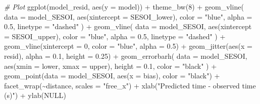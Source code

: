 \documentclass[fleqn,10pt,lineno]{wlpeerj} %
\newenvironment{Shaded}{\begin{snugshade}}{\end{snugshade}}
\newcommand{\AttributeTok}[1]{\textcolor[rgb]{0.77,0.63,0.00}{#1}}
\newcommand{\CommentTok}[1]{\textcolor[rgb]{0.56,0.35,0.01}{\textit{#1}}}
\newcommand{\ConstantTok}[1]{\textcolor[rgb]{0.00,0.00,0.00}{#1}}
\newcommand{\DecValTok}[1]{\textcolor[rgb]{0.00,0.00,0.81}{#1}}
\newcommand{\FloatTok}[1]{\textcolor[rgb]{0.00,0.00,0.81}{#1}}
\newcommand{\FunctionTok}[1]{\textcolor[rgb]{0.00,0.00,0.00}{#1}}
\newcommand{\NormalTok}[1]{#1}
\newcommand{\SpecialCharTok}[1]{\textcolor[rgb]{0.00,0.00,0.00}{#1}}
\newcommand{\StringTok}[1]{\textcolor[rgb]{0.31,0.60,0.02}{#1}}
\begin{document}
\begin{Shaded}
\begin{Highlighting}[]
\CommentTok{\# Plot}
\FunctionTok{ggplot}\NormalTok{(model\_resid, }\FunctionTok{aes}\NormalTok{(}\AttributeTok{y =}\NormalTok{ model)) }\SpecialCharTok{+}
  \FunctionTok{theme\_bw}\NormalTok{(}\DecValTok{8}\NormalTok{) }\SpecialCharTok{+}
  \FunctionTok{geom\_vline}\NormalTok{(}
    \AttributeTok{data =}\NormalTok{ model\_SESOI,}
    \FunctionTok{aes}\NormalTok{(}\AttributeTok{xintercept =}\NormalTok{ SESOI\_lower),}
    \AttributeTok{color =} \StringTok{"blue"}\NormalTok{, }\AttributeTok{alpha =} \FloatTok{0.5}\NormalTok{, }\AttributeTok{linetype =} \StringTok{"dashed"}
\NormalTok{  ) }\SpecialCharTok{+}
  \FunctionTok{geom\_vline}\NormalTok{(}
    \AttributeTok{data =}\NormalTok{ model\_SESOI,}
    \FunctionTok{aes}\NormalTok{(}\AttributeTok{xintercept =}\NormalTok{ SESOI\_upper),}
    \AttributeTok{color =} \StringTok{"blue"}\NormalTok{, }\AttributeTok{alpha =} \FloatTok{0.5}\NormalTok{, }\AttributeTok{linetype =} \StringTok{"dashed"}
\NormalTok{  ) }\SpecialCharTok{+}
  \FunctionTok{geom\_vline}\NormalTok{(}\AttributeTok{xintercept =} \DecValTok{0}\NormalTok{, }\AttributeTok{color =} \StringTok{"blue"}\NormalTok{, }\AttributeTok{alpha =} \FloatTok{0.5}\NormalTok{) }\SpecialCharTok{+}
  \FunctionTok{geom\_jitter}\NormalTok{(}\FunctionTok{aes}\NormalTok{(}\AttributeTok{x =}\NormalTok{ resid), }\AttributeTok{alpha =} \FloatTok{0.1}\NormalTok{, }\AttributeTok{height =} \FloatTok{0.25}\NormalTok{) }\SpecialCharTok{+}
  \FunctionTok{geom\_errorbarh}\NormalTok{(}
    \AttributeTok{data =}\NormalTok{ model\_SESOI,}
    \FunctionTok{aes}\NormalTok{(}\AttributeTok{xmin =}\NormalTok{ lower, }\AttributeTok{xmax =}\NormalTok{ upper),}
    \AttributeTok{height =} \FloatTok{0.1}\NormalTok{, }\AttributeTok{color =} \StringTok{"black"}
\NormalTok{  ) }\SpecialCharTok{+}
  \FunctionTok{geom\_point}\NormalTok{(}\AttributeTok{data =}\NormalTok{ model\_SESOI, }\FunctionTok{aes}\NormalTok{(}\AttributeTok{x =}\NormalTok{ bias), }\AttributeTok{color =} \StringTok{"black"}\NormalTok{) }\SpecialCharTok{+}
  \FunctionTok{facet\_wrap}\NormalTok{(}\SpecialCharTok{\textasciitilde{}}\NormalTok{distance, }\AttributeTok{scales =} \StringTok{"free\_x"}\NormalTok{) }\SpecialCharTok{+}
  \FunctionTok{xlab}\NormalTok{(}\StringTok{"Predicted time {-} observed time (s)"}\NormalTok{) }\SpecialCharTok{+}
  \FunctionTok{ylab}\NormalTok{(}\ConstantTok{NULL}\NormalTok{)}
\end{Highlighting}
\end{Shaded}
\end{document}
